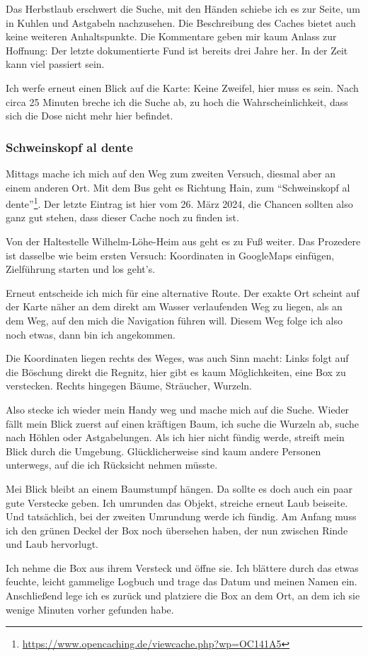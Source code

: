 Das Herbstlaub erschwert die Suche, mit den Händen schiebe ich es zur Seite, um in Kuhlen und Astgabeln nachzusehen. Die Beschreibung des Caches bietet auch keine weiteren Anhaltspunkte. Die Kommentare geben mir kaum Anlass zur Hoffnung: Der letzte dokumentierte Fund ist bereits drei Jahre her. In der Zeit kann viel passiert sein.

Ich werfe erneut einen Blick auf die Karte: Keine Zweifel, hier muss es sein. Nach circa 25 Minuten breche ich die Suche ab, zu hoch die Wahrscheinlichkeit, dass sich die Dose nicht mehr hier befindet.

\subsubsection*{Schweinskopf al dente}
Mittags mache ich mich auf den Weg zum zweiten Versuch, diesmal aber an einem anderen Ort. Mit dem Bus geht es Richtung Hain, zum \enquote{Schweinskopf al dente}\footnote{\url{https://www.opencaching.de/viewcache.php?wp=OC141A5}}. Der letzte Eintrag ist hier vom 26. März 2024, die Chancen sollten also ganz gut stehen, dass dieser Cache noch zu finden ist.

Von der Haltestelle Wilhelm-Löhe-Heim aus geht es zu Fuß weiter. Das Prozedere ist dasselbe wie beim ersten Versuch: Koordinaten in GoogleMaps einfügen, Zielführung starten und los geht's.

Erneut entscheide ich mich für eine alternative Route. Der exakte Ort scheint auf der Karte näher an dem direkt am Wasser verlaufenden Weg zu liegen, als an dem Weg, auf den mich die Navigation führen will. Diesem Weg folge ich also noch etwas, dann bin ich angekommen.

Die Koordinaten liegen rechts des Weges, was auch Sinn macht: Links folgt auf die Böschung direkt die Regnitz, hier gibt es kaum Möglichkeiten, eine Box zu verstecken. Rechts hingegen Bäume, Sträucher, Wurzeln.

Also stecke ich wieder mein Handy weg und mache mich auf die Suche. Wieder fällt mein Blick zuerst auf einen kräftigen Baum, ich suche die Wurzeln ab, suche nach Höhlen oder Astgabelungen. Als ich hier nicht fündig werde, streift mein Blick durch die Umgebung. Glücklicherweise sind kaum andere Personen unterwegs, auf die ich Rücksicht nehmen müsste.

Mei Blick bleibt an einem Baumstumpf hängen. Da sollte es doch auch ein paar gute Verstecke geben. Ich umrunden das Objekt, streiche erneut Laub beiseite. Und tatsächlich, bei der zweiten Umrundung werde ich fündig. Am Anfang muss ich den grünen Deckel der Box noch übersehen haben, der nun zwischen Rinde und Laub hervorlugt.

Ich nehme die Box aus ihrem Versteck und öffne sie. Ich blättere durch das etwas feuchte, leicht gammelige Logbuch und trage das Datum und meinen Namen ein. Anschließend lege ich es zurück und platziere die Box an dem Ort, an dem ich sie wenige Minuten vorher gefunden habe.